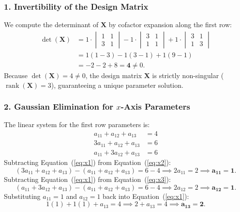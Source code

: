 \documentclass[11pt,a4paper]{article}
\begin{document}
\subsubsection{1. Invertibility of the Design Matrix}
We compute the determinant of $\mathbf{X}$ by cofactor expansion along the first row:
\begin{align}
\det(\mathbf{X}) &= 1 \cdot \begin{vmatrix} 1 & 1 \\ 3 & 1 \end{vmatrix} - 1 \cdot \begin{vmatrix} 3 & 1 \\ 1 & 1 \end{vmatrix} + 1 \cdot \begin{vmatrix} 3 & 1 \\ 1 & 3 \end{vmatrix} \\
&= 1(1 - 3) - 1(3 - 1) + 1(9 - 1) \\
&= -2 - 2 + 8 = \mathbf{4} \neq 0.
\end{align}
Because $\det(\mathbf{X}) = 4 \neq 0$, the design matrix $\mathbf{X}$ is strictly non-singular ($\operatorname{rank}(\mathbf{X}) = 3$), guaranteeing a unique parameter solution.

\subsubsection{2. Gaussian Elimination for $x$-Axis Parameters}
The linear system for the first row parameters is:
\begin{align}
a_{11} + a_{12} + a_{13} &= 4 \label{eq:x1} \\
3a_{11} + a_{12} + a_{13} &= 6 \label{eq:x2} \\
a_{11} + 3a_{12} + a_{13} &= 6 \label{eq:x3}
\end{align}
Subtracting Equation~(\ref{eq:x1}) from Equation~(\ref{eq:x2}):
\begin{equation}
(3a_{11} + a_{12} + a_{13}) - (a_{11} + a_{12} + a_{13}) = 6 - 4 \implies 2a_{11} = 2 \implies \mathbf{a_{11} = 1}.
\end{equation}
Subtracting Equation~(\ref{eq:x1}) from Equation~(\ref{eq:x3}):
\begin{equation}
(a_{11} + 3a_{12} + a_{13}) - (a_{11} + a_{12} + a_{13}) = 6 - 4 \implies 2a_{12} = 2 \implies \mathbf{a_{12} = 1}.
\end{equation}
Substituting $a_{11} = 1$ and $a_{12} = 1$ back into Equation~(\ref{eq:x1}):
\begin{equation}
1(1) + 1(1) + a_{13} = 4 \implies 2 + a_{13} = 4 \implies \mathbf{a_{13} = 2}.
\end{equation}
\end{document}
